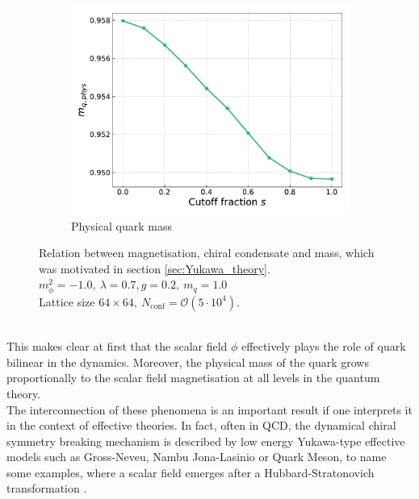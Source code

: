 \begin{figure}[h]
\begin{subfigure}[b]{0.47\textwidth}
        \includegraphics[width=1.0\textwidth]{figures/slide_broken/mass.pdf}
        \caption{Physical quark mass}
    \end{subfigure}
    \caption[Relation between magnetisation, condensate and mass]{Relation between magnetisation, chiral condensate and mass, which was motivated in section \ref{sec:Yukawa_theory}. \\ $m_\phi^2=-1.0, \ \lambda=0.7, g=0.2, \ m_q = 1.0$ \\ Lattice size $64 \times 64, \ N_\text{conf} = \mathcal{O}(5 \cdot 10^4)$.}
    \label{fig:interpolation_relation_phi_cond_mass}
\end{figure} \\
This makes clear at first that the scalar field $\phi$ effectively plays the role of quark bilinear in the dynamics. Moreover, the physical mass of the quark grows proportionally to the scalar field magnetisation at all levels in the quantum theory. \\
The interconnection of these phenomena is an important result if one interprets it in the context of effective theories. In fact, often in QCD, the dynamical chiral symmetry breaking mechanism is described by low energy Yukawa-type effective models such as Gross-Neveu, Nambu \textendash{} Jona-Lasinio or Quark Meson, to name some examples, where a scalar field emerges after a Hubbard-Stratonovich transformation \cite{hubbard}. \\
